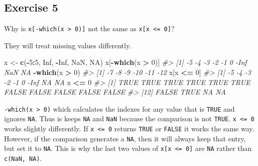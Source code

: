 \documentclass[]{book}
\newenvironment{Shaded}{\begin{snugshade}}{\end{snugshade}}
\newcommand{\CommentTok}[1]{\textcolor[rgb]{0.56,0.35,0.01}{\textit{#1}}}
\newcommand{\ControlFlowTok}[1]{\textcolor[rgb]{0.13,0.29,0.53}{\textbf{#1}}}
\newcommand{\DecValTok}[1]{\textcolor[rgb]{0.00,0.00,0.81}{#1}}
\newcommand{\KeywordTok}[1]{\textcolor[rgb]{0.13,0.29,0.53}{\textbf{#1}}}
\newcommand{\NormalTok}[1]{#1}
\newcommand{\OperatorTok}[1]{\textcolor[rgb]{0.81,0.36,0.00}{\textbf{#1}}}
\newcommand{\OtherTok}[1]{\textcolor[rgb]{0.56,0.35,0.01}{#1}}
\newcommand{\StringTok}[1]{\textcolor[rgb]{0.31,0.60,0.02}{#1}}
\theoremstyle{plain}
\theoremstyle{remark}
\theoremstyle{definition}
\theoremstyle{definition}
\theoremstyle{definition}
\theoremstyle{remark}
\begin{document}
\begin{Shaded}
\end{Shaded}

\hypertarget{exercise-5-19}{%
\subsection{Exercise 5}\label{exercise-5-19}}

Why is \texttt{x{[}-which(x\ \textgreater{}\ 0){]}} not the same as
\texttt{x{[}x\ \textless{}=\ 0{]}}?

They will treat missing values differently.

\begin{Shaded}
\begin{Highlighting}[]
\NormalTok{x <-}\StringTok{ }\KeywordTok{c}\NormalTok{(}\OperatorTok{-}\DecValTok{5}\OperatorTok{:}\DecValTok{5}\NormalTok{, }\OtherTok{Inf}\NormalTok{, }\OperatorTok{-}\OtherTok{Inf}\NormalTok{, }\OtherTok{NaN}\NormalTok{, }\OtherTok{NA}\NormalTok{)}
\NormalTok{x[}\OperatorTok{-}\KeywordTok{which}\NormalTok{(x }\OperatorTok{>}\StringTok{ }\DecValTok{0}\NormalTok{)]}
\CommentTok{#> [1]   -5   -4   -3   -2   -1    0 -Inf  NaN   NA}
\OperatorTok{-}\KeywordTok{which}\NormalTok{(x }\OperatorTok{>}\StringTok{ }\DecValTok{0}\NormalTok{)}
\CommentTok{#> [1]  -7  -8  -9 -10 -11 -12}
\NormalTok{x[x }\OperatorTok{<=}\StringTok{ }\DecValTok{0}\NormalTok{]}
\CommentTok{#> [1]   -5   -4   -3   -2   -1    0 -Inf   NA   NA}
\NormalTok{x }\OperatorTok{<=}\StringTok{ }\DecValTok{0}
\CommentTok{#>  [1]  TRUE  TRUE  TRUE  TRUE  TRUE  TRUE FALSE FALSE FALSE FALSE FALSE}
\CommentTok{#> [12] FALSE  TRUE    NA    NA}
\end{Highlighting}
\end{Shaded}

\texttt{-which(x\ \textgreater{}\ 0)} which calculates the indexes for
any value that is \texttt{TRUE} and ignores \texttt{NA}. Thus is keeps
\texttt{NA} and \texttt{NaN} because the comparison is not
\texttt{TRUE}. \texttt{x\ \textless{}=\ 0} works slightly differently.
If \texttt{x\ \textless{}=\ 0} returns \texttt{TRUE} or \texttt{FALSE}
it works the same way. However, if the comparison generates a
\texttt{NA}, then it will always keep that entry, but set it to
\texttt{NA}. This is why the last two values of
\texttt{x{[}x\ \textless{}=\ 0{]}} are \texttt{NA} rather than
\texttt{c(NaN,\ NA)}.
\end{document}
